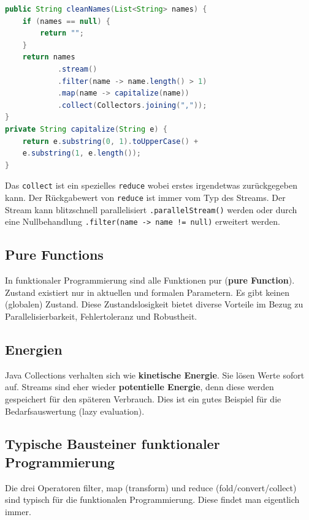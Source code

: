 \begin{lstlisting}[language=Java, caption=Company Process - Funktional]
public String cleanNames(List<String> names) {
	if (names == null) {
		return "";
	}
	return names
			.stream()
			.filter(name -> name.length() > 1)
			.map(name -> capitalize(name))
			.collect(Collectors.joining(","));
}
private String capitalize(String e) {
	return e.substring(0, 1).toUpperCase() +
	e.substring(1, e.length());
}
\end{lstlisting}

Das \verb|collect| ist ein spezielles \verb|reduce| wobei erstes irgendetwas zurückgegeben kann. Der Rückgabewert von \verb|reduce| ist immer vom Typ des Streams. Der Stream kann blitzschnell parallelisiert \verb|.parallelStream()| werden oder durch eine Nullbehandlung \verb|.filter(name -> name != null)| erweitert werden.

\subsection{Pure Functions}
In funktionaler Programmierung sind alle Funktionen pur (\textbf{pure Function}). Zustand existiert nur in aktuellen und formalen Parametern. Es gibt keinen (globalen) Zustand. Diese Zustandslosigkeit bietet diverse Vorteile im Bezug zu Parallelisierbarkeit, Fehlertoleranz und Robustheit.

\subsection{Energien}
Java Collections verhalten sich wie \textbf{kinetische Energie}. Sie lösen Werte sofort auf. Streams sind eher wieder \textbf{potentielle Energie}, denn diese werden gespeichert für den späteren Verbrauch. Dies ist ein gutes Beispiel für die Bedarfsauswertung (lazy evaluation).

\subsection{Typische Bausteiner funktionaler Programmierung}
Die drei Operatoren filter, map (transform) und reduce (fold/convert/collect) sind typisch für die funktionalen Programmierung. Diese findet man eigentlich immer.